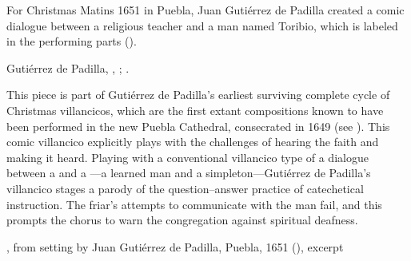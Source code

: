 For Christmas Matins 1651 in Puebla, Juan Gutiérrez de Padilla created a comic
dialogue between a religious teacher and a  man named Toribio,
which is labeled  in the performing parts 
().%
\begin{Footnote}
    Gutiérrez de Padilla, ,
    ; 
    \autocites{Stanford:Catalog}{Puebla:Microfilm}.
\end{Footnote}
This piece is part of Gutiérrez de Padilla's earliest surviving complete cycle
of Christmas villancicos, which are the first extant compositions known to have
been performed in the new Puebla Cathedral, consecrated in 1649 (see
).
This comic  villancico explicitly plays with the challenges of
hearing the faith and making it heard.
Playing with a conventional villancico type of a dialogue between a
 and a ---a learned man and a
simpleton---Gutiérrez de Padilla's villancico stages a parody of the
question--answer practice of catechetical instruction.
The friar's attempts to communicate with the  man fail, and this
prompts the chorus to warn the congregation against spiritual deafness.


{, from setting by Juan Gutiérrez de Padilla,
Puebla, 1651 (), excerpt}

